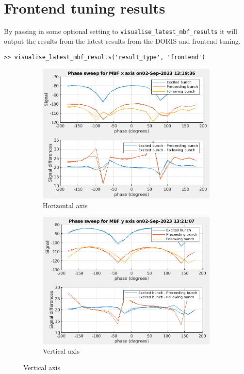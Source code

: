 \documentclass{report}
\begin{document}
\section{Frontend tuning results}
By passing in some optional setting to \verb|visualise_latest_mbf_results| it will output the results from the latest results from the DORIS and frontend tuning.
\begin{verbatim}
>> visualise_latest_mbf_results('result_type', 'frontend')
\end{verbatim}
\begin{figure}[hbt]
   \centering
    \begin{subfigure}[b]{0.45\textwidth}
        \includegraphics[width=\textwidth]{vlr_system_phase_scan_x.png}
        \caption{Horizontal axis}
        \label{fig:system_phase_example_x}
    \end{subfigure}
    \begin{subfigure}[b]{0.45\textwidth}
        \includegraphics[width=\textwidth]{vlr_system_phase_scan_y.png}
        \caption{Vertical axis}
        \label{fig:system_phase_example_y}
    \end{subfigure}
    

\end{figure}
\end{document}
